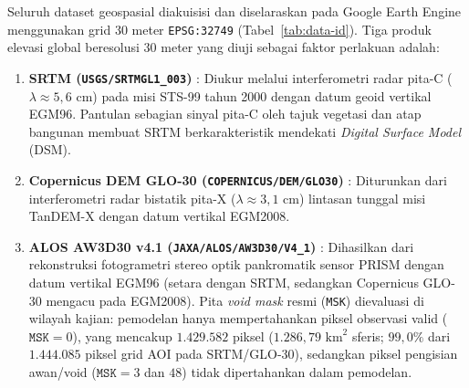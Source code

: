 \documentclass[11pt,twoside]{article}
\begin{document}
Seluruh dataset geospasial diakuisisi dan diselaraskan pada Google Earth Engine \cite{gorelick2017} menggunakan grid 30 meter \texttt{EPSG:32749} (Tabel~\ref{tab:data-id}). Tiga produk elevasi global beresolusi 30 meter yang diuji sebagai faktor perlakuan adalah:
\begin{enumerate}
\item \textbf{SRTM (\texttt{USGS/\allowbreak SRTMGL1\_003})} \cite{farr2007}: Diukur melalui interferometri radar pita-C ($\lambda \approx 5{,}6\text{ cm}$) pada misi STS-99 tahun 2000 dengan datum geoid vertikal EGM96. Pantulan sebagian sinyal pita-C oleh tajuk vegetasi dan atap bangunan membuat SRTM berkarakteristik mendekati \textit{Digital Surface Model} (DSM).
\item \textbf{Copernicus DEM GLO-30 (\texttt{COPERNICUS/\allowbreak DEM/\allowbreak GLO30})} \cite{esa_glo30}: Diturunkan dari interferometri radar bistatik pita-X ($\lambda \approx 3{,}1\text{ cm}$) lintasan tunggal misi TanDEM-X dengan datum vertikal EGM2008.
\item \textbf{ALOS AW3D30 v4.1 (\texttt{JAXA/\allowbreak ALOS/\allowbreak AW3D30/\allowbreak V4\_1})} \cite{tadono2016}: Dihasilkan dari rekonstruksi fotogrametri stereo optik pankromatik sensor PRISM dengan datum vertikal EGM96 (setara dengan SRTM, sedangkan Copernicus GLO-30 mengacu pada EGM2008). Pita \textit{void mask} resmi (\texttt{MSK}) dievaluasi di wilayah kajian: pemodelan hanya mempertahankan piksel observasi valid ($\texttt{MSK}=0$), yang mencakup $1.429.582$ piksel ($1.286{,}79\text{ km}^2$ sferis; $99{,}0\%$ dari $1.444.085$ piksel grid AOI pada SRTM/GLO-30), sedangkan piksel pengisian awan/void ($\texttt{MSK}=3$ dan $48$) tidak dipertahankan dalam pemodelan.
\end{enumerate}
\end{document}
